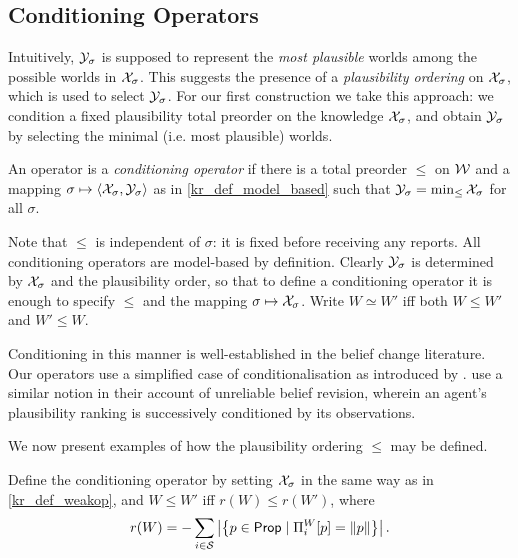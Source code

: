 \subsection{Conditioning Operators}
\label{kr_sec_conditioning_operators}

Intuitively, $\mathcal{Y}_\sigma$ is supposed to represent the \emph{most
plausible} worlds among the possible worlds in $\mathcal{X}_\sigma$. This suggests the
presence of a \emph{plausibility ordering} on $\mathcal{X}_\sigma$, which is used to
select $\mathcal{Y}_\sigma$.
%
For our first construction we take this approach: we condition a fixed
plausibility total preorder\footnotemark{} on the knowledge $\mathcal{X}_\sigma$, and
obtain $\mathcal{Y}_\sigma$ by selecting the minimal (i.e. most plausible) worlds.

\begin{definition}
\label{kr_def_conditioning_operator}
An operator is a \emph{conditioning operator} if there is a total
preorder $\le$ on $\mathcal{W}$ and a mapping $\sigma \mapsto \langle {\mathcal{X}_\sigma,
\mathcal{Y}_\sigma} \rangle$ as in \cref{kr_def_model_based} such that
$
    \mathcal{Y}_\sigma = \min_{\le}{\mathcal{X}_\sigma}
$
for all $\sigma$.
\end{definition}

Note that $\le$ is independent of $\sigma$: it is fixed before receiving any
reports. All conditioning operators are model-based by definition. Clearly
$\mathcal{Y}_\sigma$ is determined by $\mathcal{X}_\sigma$ and the plausibility order, so that to
define a conditioning operator it is enough to specify $\le$ and the mapping
$\sigma \mapsto \mathcal{X}_\sigma$. Write $W \simeq W'$ iff both $W \le W'$ and $W' \le
W$.

Conditioning in this manner is well-established in the belief change
literature. Our operators use a simplified case of conditionalisation as
introduced by \textcite{spohn1988ordinal}. \textcite{boutilier1998belief} use a
similar notion in their account of unreliable belief revision, wherein an
agent's plausibility ranking is successively conditioned by its observations.

We now present examples of how the plausibility ordering $\le$ may be defined.

\begin{definition}
    \label{kr_def_varbasedcond}
    Define the conditioning operator \varbasedcond{} by setting
    $\mathcal{X}_\sigma$ in the same way as \weakop{} in \cref{kr_def_weakop}, and $W \le
    W'$ iff $r(W) \le r(W')$, where
    \[
        r(W) = - \sum_{i \in \mathcal{S}}\left|\left\{
            p \in \mathsf{Prop}
            \mid
            \Pi^W_i[p] = \|{p}\|
        \right\}\right|.
    \]
\end{definition}

